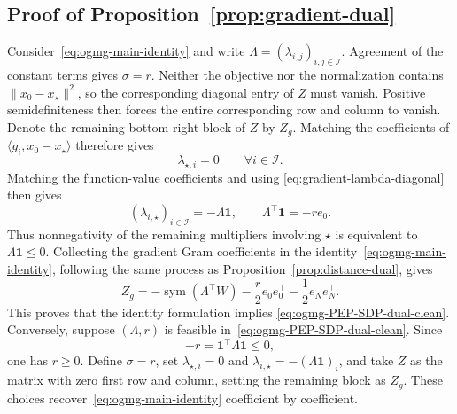 \documentclass[11pt]{article}
\begin{document}
\subsection{Proof of Proposition~\ref{prop:gradient-dual}}
\label{app:gradient-dual}
Consider~\eqref{eq:ogmg-main-identity} and write
$\Lambda=(\lambda_{i,j})_{i,j\in\mathcal I}$. Agreement of the constant terms
gives $\sigma=r$. Neither the objective nor the normalization contains
$\|x_0-x_\star\|^2$, so the corresponding diagonal entry of $Z$ must vanish.
Positive semidefiniteness then forces the entire corresponding row and column
to vanish. Denote the remaining bottom-right block of $Z$ by $Z_g$. Matching the coefficients of
$\langle g_i,x_0-x_\star\rangle$ therefore gives
\[
    \lambda_{\star,i}=0
    \qquad \forall i\in\mathcal I.
\]
Matching the function-value coefficients and using
\eqref{eq:gradient-lambda-diagonal} then gives
\[
    (\lambda_{i,\star})_{i\in\mathcal I}
    =-\Lambda\mathbf1,
    \qquad
    \Lambda^\top\mathbf1=-r e_0.
\]
Thus nonnegativity of the remaining multipliers involving $\star$ is
equivalent to $\Lambda\mathbf1\leq0$.
Collecting the gradient Gram coefficients in the identity~\eqref{eq:ogmg-main-identity}, following the same process as Proposition~\ref{prop:distance-dual}, gives
\[
Z_g=
-\operatorname{sym}(\Lambda^\top W)
-\frac r2e_0e_0^\top
-\frac12e_Ne_N^\top.
\]
This proves that the identity formulation implies
\eqref{eq:ogmg-PEP-SDP-dual-clean}. Conversely, suppose
$(\Lambda,r)$ is feasible in~\eqref{eq:ogmg-PEP-SDP-dual-clean}. Since
\[
    -r=\mathbf1^\top\Lambda\mathbf1\leq0,
\]
one has $r\geq0$. Define $\sigma=r$, set
$\lambda_{\star,i}=0$ and
$\lambda_{i,\star}=-(\Lambda\mathbf1)_i$, and take
$Z$ as the matrix with zero first row and column, setting the remaining block as $Z_g$. These choices recover~\eqref{eq:ogmg-main-identity}
coefficient by coefficient.
\end{document}
